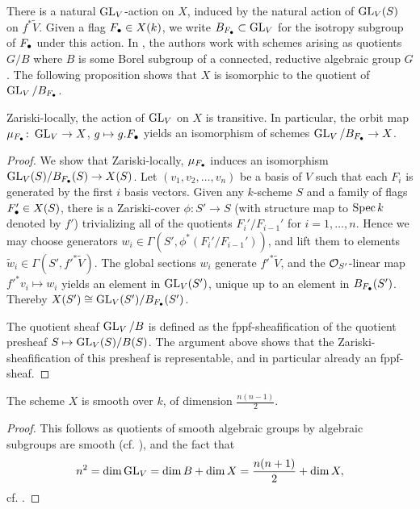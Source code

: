 \documentclass[../main.tex]{subfiles}
\begin{document}
There is a natural $\operatorname{GL}_V$-action on $X$, induced by the natural action of 
$\operatorname{GL}_V(S)$ on $f^* \tilde V$. Given a flag $F_\bullet \in
X(k)$, we write $B_{F_\bullet} \subset \operatorname{GL}_V$ for the isotropy subgroup of $F_\bullet$
under this action. In \cite{delignelusztig1976}, the authors work with schemes
arising as quotients $G/B$ where $B$ is some Borel subgroup of a connected, reductive
algebraic group $G$. 
The following proposition shows that $X$ is isomorphic to the quotient of 
$\operatorname{GL}_V/B_{F_\bullet}$.

\begin{prop}\label{prop:FlagVarietyAsQuotient}
  Zariski-locally, the action of $\operatorname{GL}_V$ on $X$ is transitive. 
  In particular, the orbit map $\mu_{F_\bullet}\colon  \operatorname{GL}_V \to X$, $g \mapsto g.F_\bullet$
  yields an isomorphism of schemes $\operatorname{GL}_V/B_{F_\bullet} \to X$. 
\begin{proof}
  We show that Zariski-locally, $\mu_{F_\bullet}$ induces an isomorphism 
  $\operatorname{GL}_V(S)/B_{F_\bullet}(S) \to X(S)$.
  Let $(v_1, v_2, \dots, v_n)$ be a basis of $V$ such that each $F_i$ is generated
  by the first $i$ basis vectors. 
  Given any $k$-scheme $S$ and a family of flags $F_\bullet' \in X(S)$, 
  there is a Zariski-cover $\phi\colon  S' \to S$ (with structure map to $\operatorname{Spec} k$ denoted
  by $f'$) trivializing all of the quotients $F_i'/F_{i-1}'$ for $i = 1, \dots,
  n$. Hence we may choose generators $w_i \in \Gamma(S', \phi^*(F_i'/F_{i-1}'))$,
  and lift them to elements $\tilde w_i \in \Gamma(S', f'^* \tilde V)$. The 
  global sections $w_i$ generate $f'^* \tilde V$, and the $\mathcal{O}_{S'}$-linear
  map $f'^* v_i \mapsto w_i$ yields an element in $\operatorname{GL}_V(S')$, unique up to 
  an element in $B_{F_\bullet}(S')$. Thereby $X(S') \cong \operatorname{GL}_V(S')/B_{F_\bullet}(S')$.

  The quotient sheaf $\operatorname{GL}_V/B$ is 
  defined as the fppf-sheafification of the quotient presheaf $S \mapsto \operatorname{GL}_V(S)/B(S)$.
  The argument above shows that the Zariski-sheafification of this presheaf is
  representable, and in particular already an fppf-sheaf.
\end{proof}
\end{prop}

\begin{cor}\label{cor:XisSmoothAndOfDimension}
  The scheme $X$ is smooth over $k$, of dimension $\frac{n(n-1)}2$. 
\begin{proof}
  This follows as quotients of smooth algebraic groups by algebraic subgroups are 
  smooth (cf. \cite[Corollary 5.26]{milne2017algebraic}), and the fact that 
  $$n^2 = \dim \operatorname{GL}_V = \dim B + \dim X = \frac{n(n+1)}2 + \dim X,$$
  cf. \cite[Proposition 5.23]{milne2017algebraic}. 
\end{proof}
\end{cor}
\end{document}
